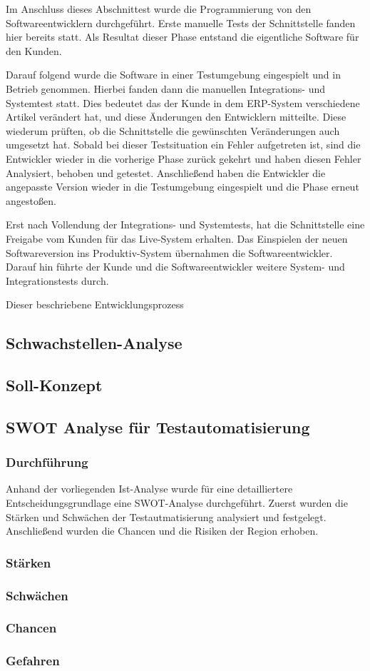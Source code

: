 Im Anschluss dieses Abschnittest wurde die Programmierung von den Softwareentwicklern durchgeführt. Erste manuelle Tests der Schnittstelle fanden hier bereits statt. Als Resultat dieser Phase entstand die eigentliche Software für den Kunden. 

Darauf folgend wurde die Software in einer Testumgebung eingespielt und in Betrieb genommen. Hierbei fanden dann die manuellen Integrations- und Systemtest statt. Dies bedeutet das der Kunde in dem ERP-System verschiedene Artikel verändert hat, und diese Änderungen den Entwicklern mitteilte. Diese wiederum prüften, ob die Schnittstelle die gewünschten Veränderungen auch umgesetzt hat. Sobald bei dieser Testsituation ein Fehler aufgetreten ist, sind die Entwickler wieder in die vorherige Phase zurück gekehrt und haben diesen Fehler Analysiert, behoben und getestet. Anschließend haben die Entwickler die angepasste Version wieder in die Testumgebung eingespielt und die Phase erneut angestoßen.

Erst nach Vollendung der Integrations- und Systemtests, hat die Schnittstelle eine Freigabe vom Kunden für das Live-System erhalten. Das Einspielen der neuen Softwareversion ins Produktiv-System übernahmen die Softwareentwickler. Darauf hin führte der Kunde und die Softwareentwickler weitere System- und Integrationstests durch.

Dieser beschriebene Entwicklungsprozess 

\subsection{Schwachstellen-Analyse}


\subsection{Soll-Konzept}

\subsection{SWOT Analyse für Testautomatisierung}
\subsubsection{Durchführung}
Anhand der vorliegenden Ist-Analyse wurde für eine detailliertere Entscheidungsgrundlage eine SWOT-Analyse durchgeführt.
Zuerst wurden die Stärken und Schwächen der Testautmatisierung analysiert und festgelegt. Anschließend wurden die Chancen und die Risiken der Region erhoben. 
\subsubsection{Stärken}
\subsubsection{Schwächen}
\subsubsection{Chancen}
\subsubsection{Gefahren}


